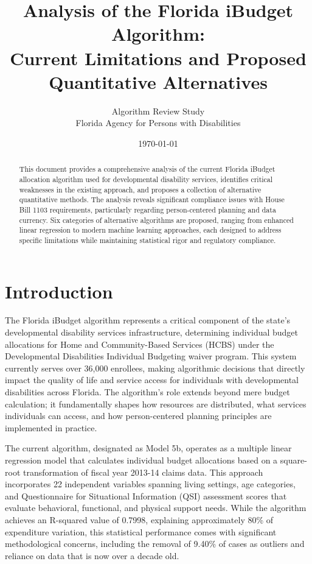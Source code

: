 \documentclass[12pt]{article}
\title{Analysis of the Florida iBudget Algorithm:\\
Current Limitations and Proposed Quantitative Alternatives}
\author{Algorithm Review Study\\
Florida Agency for Persons with Disabilities}
\date{\today}
\begin{document}
\maketitle

\begin{abstract}
This document provides a comprehensive analysis of the current Florida iBudget allocation algorithm used for developmental disability services, identifies critical weaknesses in the existing approach, and proposes a collection of alternative quantitative methods. The analysis reveals significant compliance issues with House Bill 1103 requirements, particularly regarding person-centered planning and data currency. Six categories of alternative algorithms are proposed, ranging from enhanced linear regression to modern machine learning approaches, each designed to address specific limitations while maintaining statistical rigor and regulatory compliance.
\end{abstract}

\tableofcontents
\newpage

\section{Introduction}

The Florida iBudget algorithm represents a critical component of the state's developmental disability services infrastructure, determining individual budget allocations for Home and Community-Based Services (HCBS) under the Developmental Disabilities Individual Budgeting waiver program. This system currently serves over 36,000 enrollees, making algorithmic decisions that directly impact the quality of life and service access for individuals with developmental disabilities across Florida. The algorithm's role extends beyond mere budget calculation; it fundamentally shapes how resources are distributed, what services individuals can access, and how person-centered planning principles are implemented in practice.

The current algorithm, designated as Model 5b, operates as a multiple linear regression model that calculates individual budget allocations based on a square-root transformation of fiscal year 2013-14 claims data. This approach incorporates 22 independent variables spanning living settings, age categories, and Questionnaire for Situational Information (QSI) assessment scores that evaluate behavioral, functional, and physical support needs. While the algorithm achieves an R-squared value of 0.7998, explaining approximately 80\% of expenditure variation, this statistical performance comes with significant methodological concerns, including the removal of 9.40\% of cases as outliers and reliance on data that is now over a decade old.
\end{document}
